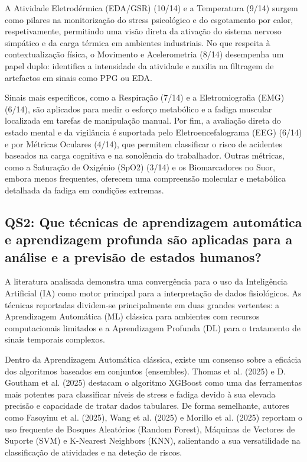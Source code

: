 A Atividade Eletrodérmica (EDA/GSR) (10/14) e a Temperatura (9/14) surgem como pilares na monitorização do stress psicológico e do esgotamento por calor, respetivamente, permitindo uma visão direta da ativação do sistema nervoso simpático e da carga térmica em ambientes industriais. No que respeita à contextualização física, o Movimento e Acelerometria (8/14) desempenha um papel duplo: identifica a intensidade da atividade e auxilia na filtragem de artefactos em sinais como PPG ou EDA.

Sinais mais específicos, como a Respiração (7/14) e a Eletromiografia (EMG) (6/14), são aplicados para medir o esforço metabólico e a fadiga muscular localizada em tarefas de manipulação manual. Por fim, a avaliação direta do estado mental e da vigilância é suportada pelo Eletroencefalograma (EEG) (6/14) e por Métricas Oculares (4/14), que permitem classificar o risco de acidentes baseados na carga cognitiva e na sonolência do trabalhador. Outras métricas, como a Saturação de Oxigénio (SpO2) (3/14) e os Biomarcadores no Suor, embora menos frequentes, oferecem uma compreensão molecular e metabólica detalhada da fadiga em condições extremas.

\subsection*{QS2: Que técnicas de aprendizagem automática e aprendizagem profunda são aplicadas para a análise e a previsão de estados humanos?}
\label{subsec:qs2}

A literatura analisada demonstra uma convergência para o uso da Inteligência Artificial (IA) como motor principal para a interpretação de dados fisiológicos. As técnicas reportadas dividem-se principalmente em duas grandes vertentes: a Aprendizagem Automática (ML) clássica para ambientes com recursos computacionais limitados e a Aprendizagem Profunda (DL) para o tratamento de sinais temporais complexos.

Dentro da Aprendizagem Automática clássica, existe um consenso sobre a eficácia dos algoritmos baseados em conjuntos (ensembles). Thomas et al. (2025) e D. Goutham et al. (2025)\cite{thomas2025,goutham2025} destacam o algoritmo XGBoost como uma das ferramentas mais potentes para classificar níveis de stress e fadiga devido à sua elevada precisão e capacidade de tratar dados tabulares. De forma semelhante, autores como Fasoyinu et al. (2025), Wang et al. (2025) e Morillo et al. (2025)\cite{fasoyinu2025,wang2024,albarran2025} reportam o uso frequente de Bosques Aleatórios (Random Forest), Máquinas de Vectores de Suporte (SVM) e K-Nearest Neighbors (KNN), salientando a sua versatilidade na classificação de atividades e na deteção de riscos.

